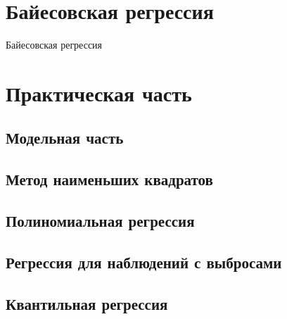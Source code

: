 \documentclass[a4paper,12pt]{article}
\begin{document}
\section{Байесовская регрессия}
Байесовская регрессия\\

\section{Практическая часть}

\subsection{Модельная часть}

\subsection{Метод наименьших квадратов}

\subsection{Полиномиальная регрессия}

\subsection{Регрессия для наблюдений с выбросами}

\subsection{Квантильная регрессия}
\end{document}

